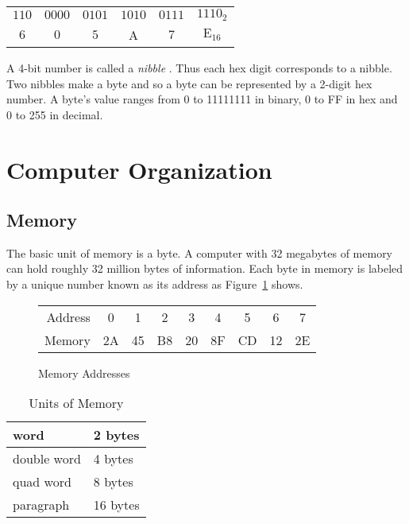 \begin{tabular}{cccccc}
$110$ & $0000$ & $0101$ & $1010$ & $0111$ & $1110_2$ \\
  $6$ & $0$    &   $5$  &   A  &  $7$   &    $\mathrm{E}_{16}$ \\
\end{tabular}\newline

A 4-bit number is called a \emph{nibble} . Thus each hex
digit corresponds to a nibble. Two nibbles make a byte and so a byte
can be represented by a 2-digit hex number. A byte's value ranges from
0 to 11111111 in binary, 0 to FF in hex and 0 to 255 in decimal.

\section{Computer Organization}

\subsection{Memory}

The basic unit of memory is a byte.  A computer with 32 megabytes of memory can hold roughly 32
million bytes of information. Each byte in memory is labeled by a
unique number known as its address as Figure~\ref{fig:memory} shows.

\begin{figure}[ht]
\begin{center}
\begin{tabular}{rcccccccc}
Address & 0 & 1 & 2 & 3 & 4 & 5 & 6 & 7 \\
\cline{2-9}
Memory & \multicolumn{1}{|c}{2A}  & \multicolumn{1}{|c}{45}  
       & \multicolumn{1}{|c}{B8} & \multicolumn{1}{|c}{20} 
       & \multicolumn{1}{|c}{8F} & \multicolumn{1}{|c}{CD} 
       & \multicolumn{1}{|c}{12} & \multicolumn{1}{|c|}{2E} \\
\cline{2-9}
\end{tabular}
\caption{ Memory Addresses \label{fig:memory} }
\end{center}
\end{figure}

\begin{table}
\begin{center}
\begin{tabular}{|l|l|}
\hline
word & 2 bytes \\ \hline
double word & 4 bytes \\ \hline
quad word & 8 bytes \\ \hline
paragraph & 16 bytes \\ \hline
\end{tabular}
\caption{ Units of Memory \label{tab:mem_units} }
\end{center}
\end{table}

